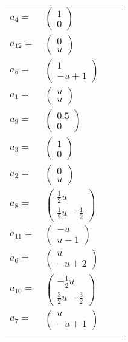 \documentclass[1p]{elsarticle_modified}
\theoremstyle{definition}
\begin{document}
\begin{tabular}{m{7pt} m{180pt} m{7pt} m{180pt} }
\flushright $a_{4}=$&$\begin{pmatrix}1\\0\end{pmatrix}$ \\
\flushright $a_{12}=$&$\begin{pmatrix}0\\u\end{pmatrix}$ \\
\flushright $a_{5}=$&$\begin{pmatrix}1\\- u+1\end{pmatrix}$ \\
\flushright $a_{1}=$&$\begin{pmatrix}u\\u\end{pmatrix}$ \\
\flushright $a_{9}=$&$\begin{pmatrix}0.5\\0\end{pmatrix}$ \\
\flushright $a_{3}=$&$\begin{pmatrix}1\\0\end{pmatrix}$ \\
\flushright $a_{2}=$&$\begin{pmatrix}0\\u\end{pmatrix}$ \\
\flushright $a_{8}=$&$\begin{pmatrix}\frac{1}{2} u\\\frac{1}{2} u-\frac{1}{2}\end{pmatrix}$ \\
\flushright $a_{11}=$&$\begin{pmatrix}- u\\u-1\end{pmatrix}$ \\
\flushright $a_{6}=$&$\begin{pmatrix}u\\- u+2\end{pmatrix}$ \\
\flushright $a_{10}=$&$\begin{pmatrix}-\frac{1}{2} u\\\frac{3}{2} u-\frac{3}{2}\end{pmatrix}$ \\
\flushright $a_{7}=$&$\begin{pmatrix}u\\- u+1\end{pmatrix}$\\&\end{tabular}
\end{document}
